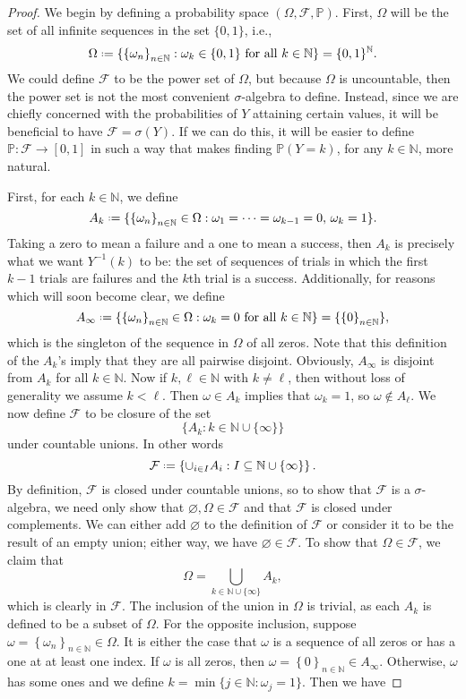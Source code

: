 \documentclass[12pt]{article}
\newcommand*{\defeq}{\mathrel{\vcenter{\baselineskip0.5ex \lineskiplimit0pt\hbox{\scriptsize.}\hbox{\scriptsize.}}}=}
\let\emptyset\varnothing %
\newcommand{\N}{\mathbb{N}} %
\renewcommand{\P}{\mathbb{P}} %
\newcommand{\FF}{\mathcal{F}} %
\newcommand{\<}{\left\langle} %
\renewcommand{\>}{\right\rangle} %
\newcommand{\seq}[2][n]{\left\{#2\right\}_{#1\in\N}} %
\begin{document}
\begin{proof}
    We begin by defining a probability space $(\Omega, \FF, \P)$. First, $\Omega$ will be the set of all infinite sequences in the set $\{0, 1\}$, i.e.,
    \[\Omega \defeq \{\seq{\omega_n} : \omega_k \in \{0, 1\} \text{ for all } k \in \N\} = \{0, 1\}^\N.\]
    We could define $\FF$ to be the power set of $\Omega$, but because $\Omega$ is uncountable, then the power set is not the most convenient $\sigma$-algebra to define. Instead, since we are chiefly concerned with the probabilities of $Y$ attaining certain values, it will be beneficial to have $\FF = \sigma(Y)$. If we can do this, it will be easier to define $\P : \FF \to [0, 1]$ in such a way that makes finding $\P(Y = k)$, for any $k \in \N$, more natural. 
    
    First, for each $k \in \N$, we define
    \[A_k \defeq \{\seq{\omega_n} \in \Omega : \omega_1 = \cdots = \omega_{k-1} = 0,\, \omega_k = 1\}.\]
    Taking a zero to mean a failure and a one to mean a success, then $A_k$ is precisely what we want $Y^{-1}(k)$ to be: the set of sequences of trials in which the first $k-1$ trials are failures and the $k$th trial is a success. Additionally, for reasons which will soon become clear, we define
    \[A_\infty \defeq \{\seq{\omega_n} \in \Omega : \omega_k = 0 \text{ for all } k \in \N\} = \{\seq{0}\},\]
    which is the singleton of the sequence in $\Omega$ of all zeros. Note that this definition of the $A_k$'s imply that they are all pairwise disjoint. Obviously, $A_\infty$ is disjoint from $A_k$ for all $k\in\N$. Now if $k, \ell \in \N$ with $k \ne \ell$, then without loss of generality we assume $k < \ell$. Then $\omega \in A_k$ implies that $\omega_k = 1$, so $\omega \notin A_\ell$. We now define $\FF$ to be closure of the set
    \[\{A_k : k \in \N \cup \{\infty\}\}\]
    under countable unions. In other words
    \[\FF \defeq \left\{ \cup_{i \in I} A_i : I \subseteq \N \cup \{\infty\} \right\}.\]
    By definition, $\FF$ is closed under countable unions, so to show that $\FF$ is a $\sigma$-algebra, we need only show that $\emptyset, \Omega \in \FF$ and that $\FF$ is closed under complements. We can either add $\emptyset$ to the definition of $\FF$ or consider it to be the result of an empty union; either way, we have $\emptyset \in \FF$. To show that $\Omega \in \FF$, we claim that
    \[\Omega = \bigcup_{k \in \N\cup\{\infty\}} A_k,\]
    which is clearly in $\FF$. The inclusion of the union in $\Omega$ is trivial, as each $A_k$ is defined to be a subset of $\Omega$. For the opposite inclusion, suppose $\omega = \seq{\omega_n} \in \Omega$. It is either the case that $\omega$ is a sequence of all zeros or has a one at at least one index. If $\omega$ is all zeros, then $\omega = \seq{0} \in A_\infty$. Otherwise, $\omega$ has some ones and we define $k = \min\{j \in \N : \omega_j = 1\}$. Then we have

\end{proof}
\end{document}
